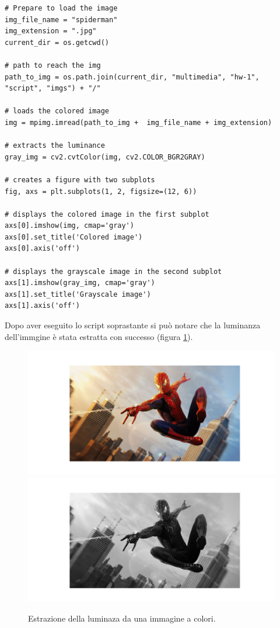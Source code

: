 \begin{lstlisting}
# Prepare to load the image
img_file_name = "spiderman"
img_extension = ".jpg"
current_dir = os.getcwd()

# path to reach the img
path_to_img = os.path.join(current_dir, "multimedia", "hw-1", "script", "imgs") + "/"

# loads the colored image
img = mpimg.imread(path_to_img +  img_file_name + img_extension) 

# extracts the luminance
gray_img = cv2.cvtColor(img, cv2.COLOR_BGR2GRAY)

# creates a figure with two subplots
fig, axs = plt.subplots(1, 2, figsize=(12, 6))

# displays the colored image in the first subplot
axs[0].imshow(img, cmap='gray')
axs[0].set_title('Colored image')
axs[0].axis('off')

# displays the grayscale image in the second subplot
axs[1].imshow(gray_img, cmap='gray')
axs[1].set_title('Grayscale image')
axs[1].axis('off')
\end{lstlisting}

\noindent Dopo aver eseguito lo script soprastante si può notare che la luminanza dell'immgine è stata estratta con successo (figura \ref{fig:luminanza}).

\begin{figure}[h]
    \centering
    \includegraphics[width = .7\textwidth]{hw-1/report/imgs/colored.png}
    \includegraphics[width = .7\textwidth]{hw-1/report/imgs/grayscale.png}
    \caption{Estrazione della luminaza da una immagine a colori.}
    \label{fig:luminanza}
\end{figure}

